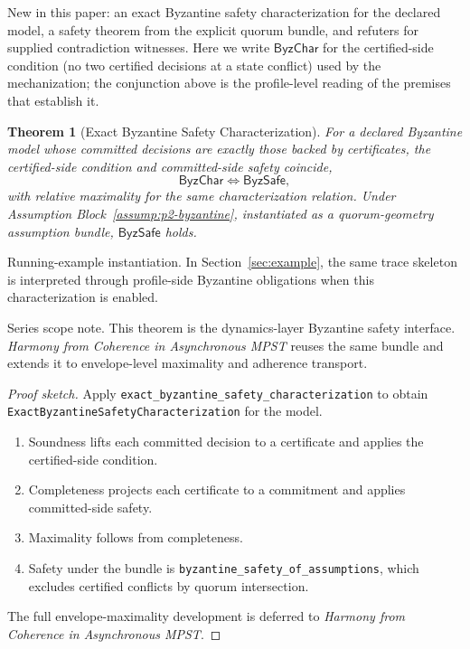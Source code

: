 \documentclass[a4paper,10pt,twocolumn,english]{article}
\numberwithin{equation}{section}
\theoremstyle{paperdef}
\theoremstyle{paperplain}
\newtheorem{theorem}[definition]{Theorem}
\theoremstyle{paperdef}
\theoremstyle{paperremark}
\newcommand{\ByzSafe}{\ensuremath{\mathsf{ByzSafe}}}
\newcommand{\ByzChar}{\ensuremath{\mathsf{ByzChar}}}
\begin{document}
New in this paper: an exact Byzantine safety characterization for the
declared model, a safety theorem from the explicit quorum bundle, and refuters
for supplied contradiction witnesses. Here we write $\ByzChar$ for the
certified-side condition (no two certified decisions at a state conflict) used
by the mechanization; the conjunction above is the profile-level reading of
the premises that establish it.

\begin{theorem}[Exact Byzantine Safety Characterization]
	\label{thm:byzantine}
	For a declared Byzantine model whose committed decisions are exactly those backed by certificates, the certified-side condition and committed-side safety coincide,
	\begin{equation}
		\ByzChar \iff \ByzSafe,
	\end{equation}
	with relative maximality for the same characterization relation. Under Assumption Block~\ref{assump:p2-byzantine}, instantiated as a quorum-geometry assumption bundle, $\ByzSafe$ holds.
\end{theorem}

Running-example instantiation. In Section~\ref{sec:example}, the same trace
skeleton is interpreted through profile-side Byzantine obligations when this
characterization is enabled.

Series scope note. This theorem is the dynamics-layer Byzantine safety interface. \emph{Harmony from Coherence in Asynchronous MPST} reuses the same bundle and extends it to envelope-level maximality and adherence transport.

\begin{proof}[Proof sketch]
	Apply \nolinkurl{exact_byzantine_safety_characterization} to obtain \texttt{ExactByzantineSafetyCharacterization} for the model.

	\begin{enumerate}
		\item Soundness lifts each committed decision to a certificate and applies the certified-side condition.
		\item Completeness projects each certificate to a commitment and applies committed-side safety.
		\item Maximality follows from completeness.
		\item Safety under the bundle is \nolinkurl{byzantine_safety_of_assumptions}, which excludes certified conflicts by quorum intersection.
	\end{enumerate}

	The full envelope-maximality development is deferred to \emph{Harmony from Coherence in Asynchronous MPST}.
\end{proof}
\end{document}
